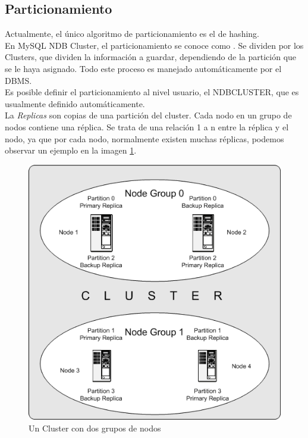 \documentclass{acmart}
\begin{document}
\subsection{Particionamiento}
Actualmente, el único algoritmo de particionamiento es el de hashing.\\
En MySQL NDB Cluster, el particionamiento se conoce como . Se dividen por los Clusters, que dividen la información a guardar, dependiendo de la partición que se le haya asignado. Todo este proceso es manejado automáticamente por el DBMS.\\
Es posible definir el particionamiento al nivel usuario, el NDBCLUSTER, que es usualmente definido automáticamente.\\
La \textit{Replicas} son copias de una partición del cluster. Cada nodo en un grupo de nodos contiene una réplica. Se trata de una relación 1 a n entre la réplica y el nodo, ya que por cada nodo, normalmente existen muchas réplicas, podemos observar un ejemplo en la imagen \ref{dosnodos}.

\begin{figure}
    \centering
    \includegraphics[width=0.4\linewidth]{replicas.png}
    \caption{Un Cluster con dos grupos de nodos}
    \label{dosnodos}
\end{figure}
\end{document}
